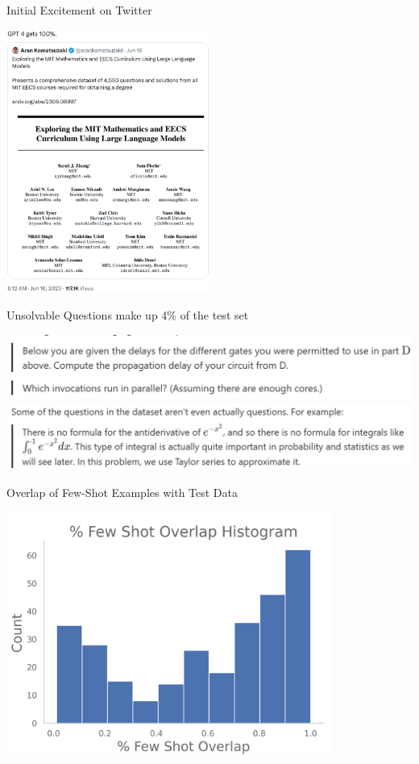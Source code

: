 \begin{vbframe}{Initial Excitement on Twitter}

	\includegraphics[width=0.5\textwidth]{evaluation_figures/twitter_mit.png}
\end{vbframe}	

\begin{vbframe}{Unsolvable Questions make up 4\% of the test set}

	\includegraphics[width=\textwidth]{evaluation_figures/unsolvable_1.png}
	\vfill
	\includegraphics[width=\textwidth]{evaluation_figures/unsolvable_2.png}

\end{vbframe}

\begin{vbframe}{Overlap of Few-Shot Examples with Test Data}

	\includegraphics[width=0.8\textwidth]{evaluation_figures/overlap.png}

\end{vbframe}

